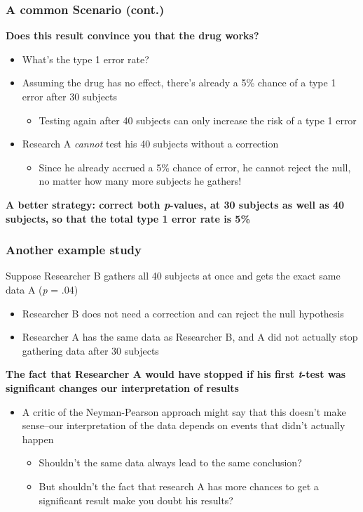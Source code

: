 \documentclass[10pt, block=fill]{beamer}
\begin{document}
\begin{frame}
  \frametitle{A common Scenario (cont.)}
  
  \textbf{Does this result convince you that the drug works?}
  \begin{itemize}
      \item What's the type 1 error rate?
      \item Assuming the drug has no effect, there's already a 5\% chance of a type 1 error after 30 subjects
      \begin{itemize}
          \item Testing again after 40 subjects can only increase the risk of a type 1 error
      \end{itemize}
      \item Research A \textit{cannot} test his 40 subjects without a correction
      \begin{itemize}
          \item Since he already accrued a 5\% chance of error, he cannot reject the null, no matter how many more subjects he gathers!
      \end{itemize}
  \end{itemize}
  
   \textbf{A better strategy: correct both \textit{p}-values, at 30 subjects as well as 40 subjects, so that the total type 1 error rate is 5\%}
\end{frame}


\begin{frame}
   \frametitle{Another example study}

   Suppose Researcher B gathers all 40 subjects at once and gets the exact same data A (\textit{p} = .04)   
   \begin{itemize}
       \item Researcher B does not need a correction and can reject the null hypothesis
       \item Researcher A has the same data as Researcher B, and A did not actually stop gathering data after 30 subjects
   \end{itemize}
   
   \textbf{The fact that Researcher A would have stopped if his first \textit{t}-test was significant changes our interpretation of results}
   \begin{itemize}
       \item A critic of the Neyman-Pearson approach might say that this doesn't make sense--our interpretation of the data depends on events that didn't actually happen
       \begin{itemize}
           \item Shouldn't the same data always lead to the same conclusion?
           \item But shouldn't the fact that research A has more chances to get a significant result make you doubt his results?
       \end{itemize}
   \end{itemize}
    
\end{frame}
\end{document}
